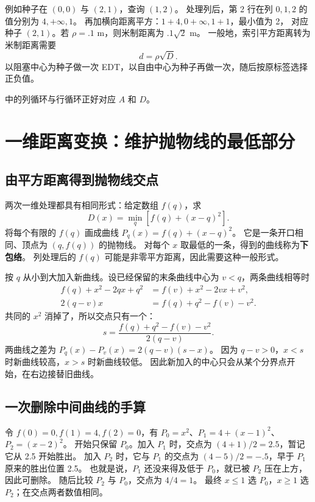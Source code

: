 例如种子在 $(0,0)$ 与 $(2,1)$，查询 $(1,2)$。
处理列后，第 2 行在列 $0,1,2$ 的值分别为 $4,+\infty,1$。
再加横向距离平方：$1+4,0+\infty,1+1$，最小值为 2，
对应种子 $(2,1)$。若 $\rho=.1$ m，则米制距离为 $.1\sqrt2$ m。
一般地，索引平方距离转为米制距离需要
\begin{equation}d=\rho\sqrt D.\end{equation}
以阻塞中心为种子做一次 EDT，以自由中心为种子再做一次，随后按原标签选择正负值。

 中的列循环与行循环正好对应 $A$ 和 $D$。

\section{一维距离变换：维护抛物线的最低部分}
\subsection{由平方距离得到抛物线交点}
两次一维处理都具有相同形式：给定数组 $f(q)$，求
\begin{equation}D(x)=\min_q[f(q)+(x-q)^2].\end{equation}
将每个有限的 $f(q)$ 画成曲线 $P_q(x)=f(q)+(x-q)^2$。
它是一条开口相同、顶点为 $(q,f(q))$ 的抛物线。
对每个 $x$ 取最低的一条，得到的曲线称为\textbf{下包络}。
列处理后的 $f(q)$ 可能是非零平方距离，因此需要这种一般形式。

按 $q$ 从小到大加入新曲线。设已经保留的末条曲线中心为 $v<q$，两条曲线相等时
\begin{align}
f(q)+x^2-2qx+q^2&=f(v)+x^2-2vx+v^2,\\
2(q-v)x&=f(q)+q^2-f(v)-v^2.
\end{align}
共同的 $x^2$ 消掉了，所以交点只有一个：
\begin{equation}s=\frac{f(q)+q^2-f(v)-v^2}{2(q-v)}.\end{equation}
两曲线之差为 $P_q(x)-P_v(x)=2(q-v)(s-x)$。
因为 $q-v>0$，$x<s$ 时新曲线较高，$x>s$ 时新曲线较低。
因此新加入的中心只会从某个分界点开始，在右边接替旧曲线。

\subsection{一次删除中间曲线的手算}
令 $f(0)=0,f(1)=4,f(2)=0$，有
$P_0=x^2$、$P_1=4+(x-1)^2$、$P_2=(x-2)^2$。
开始只保留 $P_0$。加入 $P_1$ 时，交点为 $(4+1)/2=2.5$，暂记它从 2.5 开始胜出。
加入 $P_2$ 时，它与 $P_1$ 的交点为 $(4-5)/2=-.5$，早于 $P_1$ 原来的胜出位置 2.5。
也就是说，$P_1$ 还没来得及低于 $P_0$，就已被 $P_2$ 压在上方，因此可删除。
随后比较 $P_2$ 与 $P_0$，交点为 $4/4=1$。
最终 $x\leq1$ 选 $P_0$，$x\geq1$ 选 $P_2$；在交点两者数值相同。

